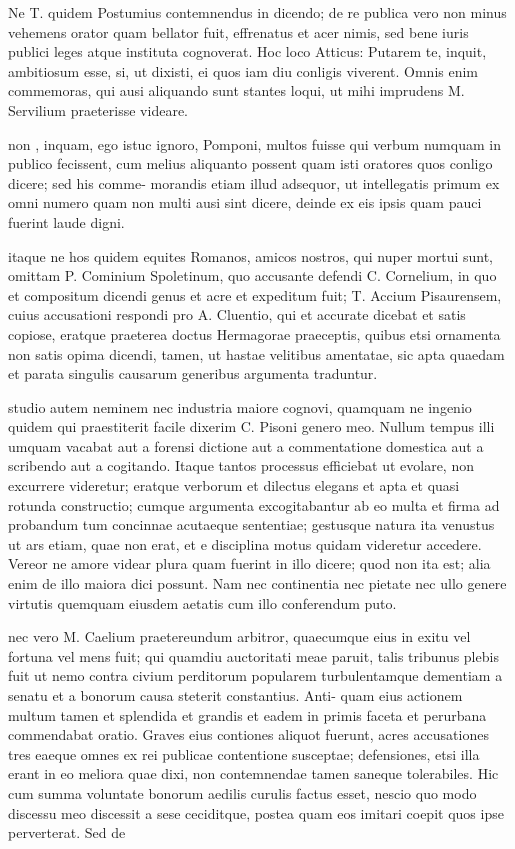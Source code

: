  Ne T. quidem Postumius contemnendus in dicendo; de re publica vero non minus vehemens orator quam bellator fuit, effrenatus et acer nimis, sed bene iuris publici leges atque instituta cognoverat. Hoc loco Atticus: Putarem te, inquit, ambitiosum esse, si, ut dixisti, ei quos iam diu conligis viverent. Omnis enim commemoras, qui ausi aliquando sunt stantes loqui, ut mihi imprudens M. Servilium praeterisse videare.

 non , inquam, ego istuc ignoro, Pomponi, multos fuisse qui verbum numquam in publico fecissent, cum melius aliquanto possent quam isti oratores quos conligo dicere; sed his comme- morandis etiam illud adsequor, ut intellegatis primum ex omni numero quam non multi ausi sint dicere, deinde ex eis ipsis quam pauci fuerint laude digni.

 itaque ne hos quidem equites Romanos, amicos nostros, qui nuper mortui sunt, omittam P. Cominium Spoletinum, quo accusante defendi C. Cornelium, in quo et compositum dicendi genus et acre et expeditum fuit; T. Accium Pisaurensem, cuius accusationi respondi pro A. Cluentio, qui et accurate dicebat et satis copiose, eratque praeterea doctus Hermagorae praeceptis, quibus etsi ornamenta non satis opima dicendi, tamen, ut hastae velitibus amentatae, sic apta quaedam et parata singulis causarum generibus argumenta traduntur.

 studio autem neminem nec industria maiore cognovi, quamquam ne ingenio quidem qui praestiterit facile dixerim C. Pisoni genero meo. Nullum tempus illi umquam vacabat aut a forensi dictione aut a commentatione domestica aut a scribendo aut a cogitando. Itaque tantos processus efficiebat ut evolare, non excurrere videretur; eratque verborum et dilectus elegans et apta et quasi rotunda constructio; cumque argumenta excogitabantur ab eo multa et firma ad probandum tum concinnae acutaeque sententiae; gestusque natura ita venustus ut ars etiam, quae non erat, et e disciplina motus quidam videretur accedere. Vereor ne amore videar plura quam fuerint in illo dicere; quod non ita est; alia enim de illo maiora dici possunt. Nam nec continentia nec pietate nec ullo genere virtutis quemquam eiusdem aetatis cum illo conferendum puto.

 nec vero M. Caelium praetereundum arbitror, quaecumque eius in exitu vel fortuna vel mens fuit; qui quamdiu auctoritati meae paruit, talis tribunus plebis fuit ut nemo contra civium perditorum popularem turbulentamque dementiam a senatu et a bonorum causa steterit constantius. Anti- quam eius actionem multum tamen et splendida et grandis et eadem in primis faceta et perurbana commendabat oratio. Graves eius contiones aliquot fuerunt, acres accusationes tres eaeque omnes ex rei publicae contentione susceptae; defensiones, etsi illa erant in eo meliora quae dixi, non contemnendae tamen saneque tolerabiles. Hic cum summa voluntate bonorum aedilis curulis factus esset, nescio quo modo discessu meo discessit a sese ceciditque, postea quam eos imitari coepit quos ipse perverterat. Sed de

